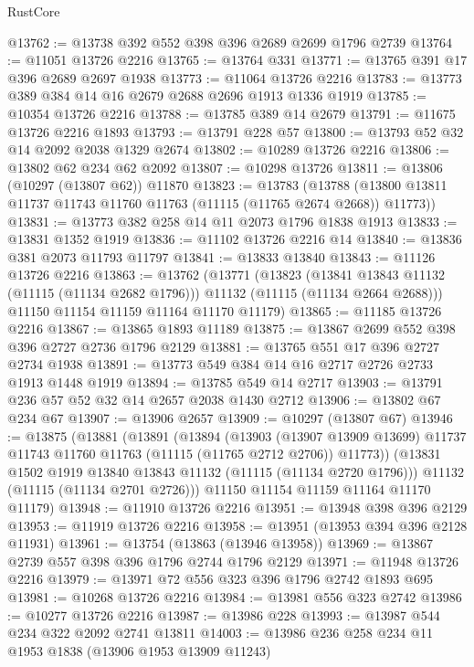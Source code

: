 \begin{lexlean}{RustCore}
\begin{coremodule}
@13762 := @13738 @392 @552 @398 @396 @2689 @2699 @1796 @2739
@13764 := @11051 @13726 @2216
@13765 := @13764 @331
@13771 := @13765 @391 @17 @396 @2689 @2697 @1938
@13773 := @11064 @13726 @2216
@13783 := @13773 @389 @384 @14 @16 @2679 @2688 @2696 @1913 @1336 @1919
@13785 := @10354 @13726 @2216
@13788 := @13785 @389 @14 @2679
@13791 := @11675 @13726 @2216 @1893
@13793 := @13791 @228 @57
@13800 := @13793 @52 @32 @14 @2092 @2038 @1329 @2674
@13802 := @10289 @13726 @2216
@13806 := @13802 @62 @234 @62 @2092
@13807 := @10298 @13726
@13811 := @13806 (@10297 (@13807 @62)) @11870
@13823 := @13783
    (@13788 (@13800 @13811 @11737 @11743 @11760 @11763 (@11115 (@11765 @2674 @2668)) @11773))
@13831 := @13773 @382 @258 @14 @11 @2073 @1796 @1838 @1913
@13833 := @13831 @1352 @1919
@13836 := @11102 @13726 @2216 @14
@13840 := @13836 @381 @2073 @11793 @11797
@13841 := @13833 @13840
@13843 := @11126 @13726 @2216
@13863 := @13762
    (@13771
      (@13823
        (@13841 @13843 @11132 (@11115 (@11134 @2682 @1796)))
        @11132
        (@11115 (@11134 @2664 @2688)))
      @11150
      @11154
      @11159
      @11164
      @11170
      @11179)
@13865 := @11185 @13726 @2216
@13867 := @13865 @1893 @11189
@13875 := @13867 @2699 @552 @398 @396 @2727 @2736 @1796 @2129
@13881 := @13765 @551 @17 @396 @2727 @2734 @1938
@13891 := @13773 @549 @384 @14 @16 @2717 @2726 @2733 @1913 @1448 @1919
@13894 := @13785 @549 @14 @2717
@13903 := @13791 @236 @57 @52 @32 @14 @2657 @2038 @1430 @2712
@13906 := @13802 @67 @234 @67
@13907 := @13906 @2657
@13909 := @10297 (@13807 @67)
@13946 := @13875
    (@13881
      (@13891
        (@13894
          (@13903
            (@13907 @13909 @13699)
            @11737
            @11743
            @11760
            @11763
            (@11115 (@11765 @2712 @2706))
            @11773))
        (@13831 @1502 @1919 @13840 @13843 @11132 (@11115 (@11134 @2720 @1796)))
        @11132
        (@11115 (@11134 @2701 @2726)))
      @11150
      @11154
      @11159
      @11164
      @11170
      @11179)
@13948 := @11910 @13726 @2216
@13951 := @13948 @398 @396 @2129
@13953 := @11919 @13726 @2216
@13958 := @13951 (@13953 @394 @396 @2128 @11931)
@13961 := @13754 (@13863 (@13946 @13958))
@13969 := @13867 @2739 @557 @398 @396 @1796 @2744 @1796 @2129
@13971 := @11948 @13726 @2216
@13979 := @13971 @72 @556 @323 @396 @1796 @2742 @1893 @695
@13981 := @10268 @13726 @2216
@13984 := @13981 @556 @323 @2742
@13986 := @10277 @13726 @2216
@13987 := @13986 @228
@13993 := @13987 @544 @234 @322 @2092 @2741 @13811
@14003 := @13986 @236 @258 @234 @11 @1953 @1838 (@13906 @1953 @13909 @11243)

\end{coremodule}
\end{lexlean}
